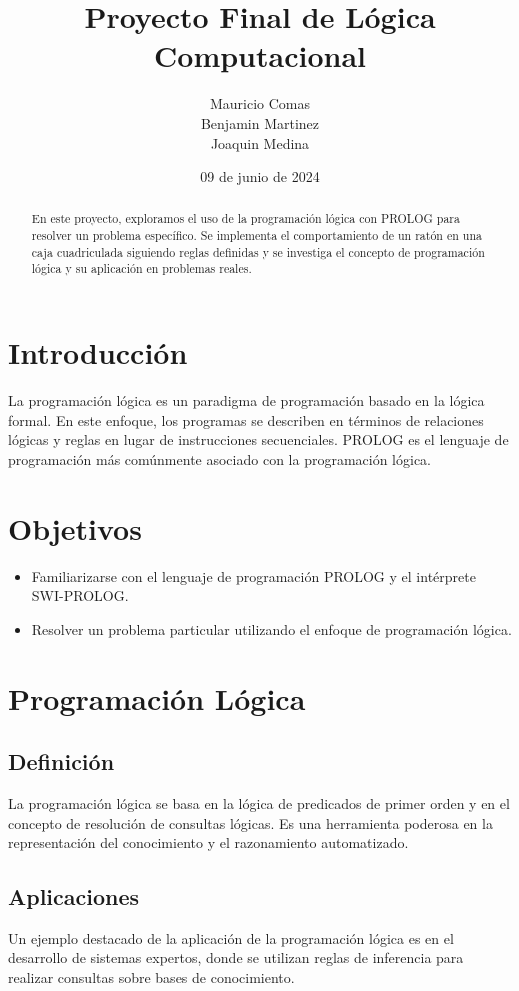 \documentclass[a4paper,12pt]{article}
\title{Proyecto Final de Lógica Computacional}
\author{Mauricio Comas \\ Benjamin Martinez \\ Joaquin Medina}
\date{09 de junio de 2024}
\begin{document}
\maketitle

\begin{abstract}
    En este proyecto, exploramos el uso de la programación lógica con PROLOG para resolver un problema específico. Se implementa el comportamiento de un ratón en una caja cuadriculada siguiendo reglas definidas y se investiga el concepto de programación lógica y su aplicación en problemas reales.
\end{abstract}

\section{Introducción}
\label{sec:intro}
La programación lógica es un paradigma de programación basado en la lógica formal. En este enfoque, los programas se describen en términos de relaciones lógicas y reglas en lugar de instrucciones secuenciales. PROLOG es el lenguaje de programación más comúnmente asociado con la programación lógica.

\section{Objetivos}
\label{sec:objetivos}
\begin{itemize}
    \item Familiarizarse con el lenguaje de programación PROLOG y el intérprete SWI-PROLOG.
    \item Resolver un problema particular utilizando el enfoque de programación lógica.
\end{itemize}

\section{Programación Lógica}
\label{sec:logica}
\subsection{Definición}
La programación lógica se basa en la lógica de predicados de primer orden y en el concepto de resolución de consultas lógicas. Es una herramienta poderosa en la representación del conocimiento y el razonamiento automatizado.

\subsection{Aplicaciones}
Un ejemplo destacado de la aplicación de la programación lógica es en el desarrollo de sistemas expertos, donde se utilizan reglas de inferencia para realizar consultas sobre bases de conocimiento.
\end{document}
